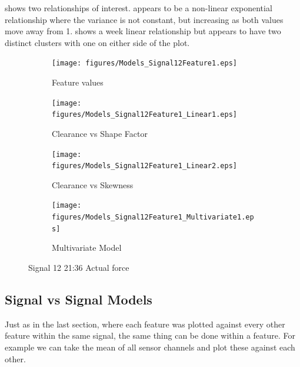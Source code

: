 \documentclass[]{article}
\begin{document}
 shows two relationships of interest.  appears to be a non-linear exponential relationship where the variance is not constant, but increasing as both values move away from 1.  shows a week linear relationship but appears to have two distinct clusters with one on either side of the plot.

\begin{figure}[H]
	\captionsetup[subfigure]{justification=Centering}
    \centering
    
		\begin{subfigure}{.45\textwidth}
		  \centering
    			\texttt{[image: figures/Models\_Signal12Feature1.eps]}
		  	\caption{Feature values}
		  	\label{fig:Models_Signal12Feature1}
		\end{subfigure}%
		\begin{subfigure}{.45\textwidth}
		  \centering
 		   	\texttt{[image: figures/Models\_Signal12Feature1\_Linear1.eps]}
		  	\caption{Clearance vs Shape Factor}
		  	\label{fig:Models_Signal12Feature1_Linear1}
		\end{subfigure}
		\bigskip
		\begin{subfigure}{.45\textwidth}
		  \centering
 		   	\texttt{[image: figures/Models\_Signal12Feature1\_Linear2.eps]}
		  	\caption{Clearance vs Skewness}
		  	\label{fig:Models_Signal12Feature1_Linear2}
		\end{subfigure}
		\begin{subfigure}{.45\textwidth}
		  \centering
 		   	\texttt{[image: figures/Models\_Signal12Feature1\_Multivariate1.eps]}
		  	\caption{Multivariate Model}
		  	\label{fig:Models_Signal12Feature1_Multivariate1}
		\end{subfigure}
		
    \caption{Signal 12 21:36 Actual force}
    \label{fig:Models_Signal12Feature1_Caption}
\end{figure}



\subsection{Signal vs Signal Models}
Just as in the last section, where each feature was plotted against every other feature within the same signal, the same thing can be done within a feature. For example we can take the mean of all sensor channels and plot these against each other.
\end{document}
